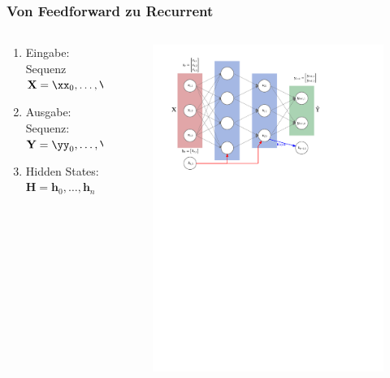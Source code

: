 \documentclass[german,aspectratio=169]{beamer}
\begin{document}
\begin{frame}
	\frametitle{Von Feedforward zu Recurrent}
	\begin{columns}
		\begin{column}{0.35\textwidth}
			\begin{enumerate}[label=$\bullet$]
				\item Eingabe: Sequenz $\mathbf{X} = \xx_0, \ldots, \xx_n$
				\item Ausgabe: Sequenz: $\mathbf{Y} = \yy_0, \ldots, \yy_n$
				\item Hidden States: $\mathbf{H} = \mathbf{h}_0, \ldots, \mathbf{h}_n$
			\end{enumerate}
		\end{column}
		\begin{column}{0.65\textwidth}
			\begin{figure}
				\includegraphics[width=\textwidth]{rnn-labeled-unfold}
			\end{figure}
		\end{column}
	\end{columns}
\end{frame}
\end{document}
